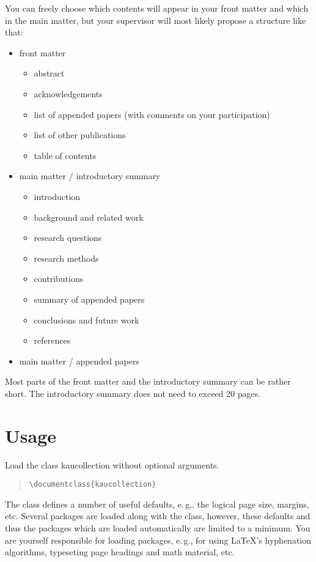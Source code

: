 \documentclass[a4paper]{ltxguide}
\begin{document}
You can freely choose which contents will appear in your front matter and which in the main matter, but your supervisor will most likely propose a structure like that:
\begin{itemize}
  \item front matter
    \begin{itemize}
       \item abstract
       \item acknowledgements
       \item list of appended papers (with comments on your participation)
       \item list of other publications
       \item table of contents
    \end{itemize}
  \item main matter / introductory summary
    \begin{itemize}
       \item introduction
       \item background and related work
       \item research questions
       \item research methods
       \item contributions
       \item summary of appended papers
       \item conclusions and future work
       \item references
    \end{itemize}
  \item main matter / appended papers
\end{itemize}
Most parts of the front matter and the introductory summary can be rather short. The introductory summary does not need to exceed 20 pages.

\section{Usage}

Load the class \textsf{kaucollection} without optional arguments.
\begin{quote}\begin{verbatim}\documentclass{kaucollection}\end{verbatim}\end{quote}

The class defines a number of useful defaults, e.\,g., the logical page size, margins, etc. Several packages are loaded along with the class, however, these defaults and thus the packages which are loaded automatically are limited to a minimum. You are yourself responsible for loading packages, e.\,g., for using \LaTeX's hyphenation algorithms, typeseting page headings and math material, etc.
\end{document}
